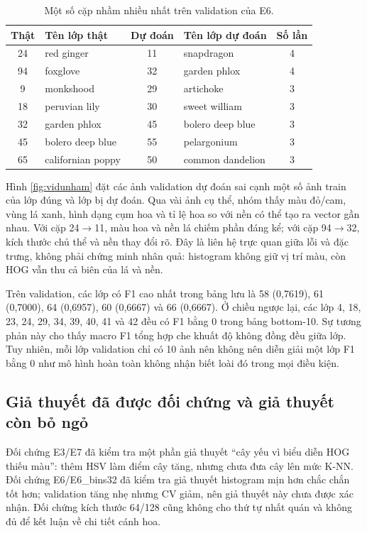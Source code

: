 \begin{table}[H]\centering\small
\caption{Một số cặp nhầm nhiều nhất trên validation của E6.}\label{tab:confusions}
\begin{tabular}{c|l|c|l|c}
\toprule
Thật & Tên lớp thật & Dự đoán & Tên lớp dự đoán & Số lần\\
\midrule
24 & red ginger & 11 & snapdragon & 4\\
94 & foxglove & 32 & garden phlox & 4\\
9 & monkshood & 29 & artichoke & 3\\
18 & peruvian lily & 30 & sweet william & 3\\
32 & garden phlox & 45 & bolero deep blue & 3\\
45 & bolero deep blue & 55 & pelargonium & 3\\
65 & californian poppy & 50 & common dandelion & 3\\
\bottomrule
\end{tabular}
\end{table}

Hình \ref{fig:vidunham} đặt các ảnh validation dự đoán sai cạnh một số ảnh train của lớp đúng và lớp bị dự đoán. Qua vài ảnh cụ thể, nhóm thấy màu đỏ/cam, vùng lá xanh, hình dạng cụm hoa và tỉ lệ hoa so với nền có thể tạo ra vector gần nhau. Với cặp 24$\rightarrow$11, màu hoa và nền lá chiếm phần đáng kể; với cặp 94$\rightarrow$32, kích thước chủ thể và nền thay đổi rõ. Đây là liên hệ trực quan giữa lỗi và đặc trưng, không phải chứng minh nhân quả: histogram không giữ vị trí màu, còn HOG vẫn thu cả biên của lá và nền.

Trên validation, các lớp có F1 cao nhất trong bảng lưu là 58 (0,7619), 61 (0,7000), 64 (0,6957), 60 (0,6667) và 66 (0,6667). Ở chiều ngược lại, các lớp 4, 18, 23, 24, 29, 34, 39, 40, 41 và 42 đều có F1 bằng 0 trong bảng bottom-10. Sự tương phản này cho thấy macro F1 tổng hợp che khuất độ không đồng đều giữa lớp. Tuy nhiên, mỗi lớp validation chỉ có 10 ảnh nên không nên diễn giải một lớp F1 bằng 0 như mô hình hoàn toàn không nhận biết loài đó trong mọi điều kiện.

\subsection{Giả thuyết đã được đối chứng và giả thuyết còn bỏ ngỏ}
Đối chứng E3/E7 đã kiểm tra một phần giả thuyết ``cây yếu vì biểu diễn HOG thiếu màu'': thêm HSV làm điểm cây tăng, nhưng chưa đưa cây lên mức K-NN. Đối chứng E6/E6\_bins32 đã kiểm tra giả thuyết histogram mịn hơn chắc chắn tốt hơn; validation tăng nhẹ nhưng CV giảm, nên giả thuyết này chưa được xác nhận. Đối chứng kích thước 64/128 cũng không cho thứ tự nhất quán và không đủ để kết luận về chi tiết cánh hoa.

